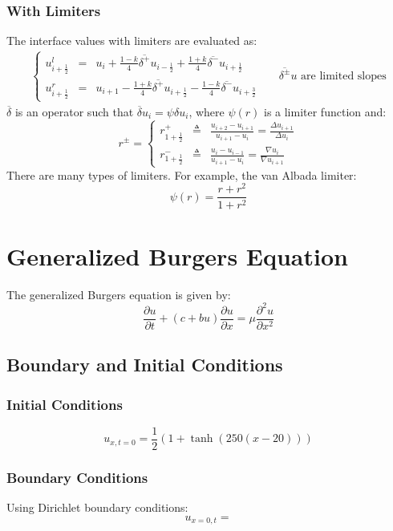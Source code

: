 \documentclass[11pt, a4paper]{article}
\begin{document}
\subsubsection{With Limiters}
The interface values with limiters are evaluated as:
\begin{equation}
    \begin{matrix}
        \left\{\begin{array}{lcl}
            u_{i+\frac{1}{2}}^l & = & u_i+\frac{1-k}{4}\overline{\delta^+} u_{i-\frac{1}{2}}+\frac{1+k}{4}\overline{\delta^-} u_{i+\frac{1}{2}} \\
            u_{i+\frac{1}{2}}^r & = & u_{i+1}-\frac{1+k}{4}\overline{\delta^+} u_{i+\frac{1}{2}}-\frac{1-k}{4}\overline{\delta^-} u_{i+\frac{3}{2}}
        \end{array}\right. && {\overline{\delta^\pm}} u\text{ are limited slopes}
    \end{matrix}
\end{equation}
$\overline{\delta}$ is an operator such that $\overline{\delta}u_i=\psi\delta u_i$, where $\psi\left(r\right)$ is a limiter function and:
\begin{equation}
    r^\pm=\left\{\begin{array}{ccc}
        r_{1+\frac{1}{2}}^+ & \triangleq & \displaystyle\frac{u_{i+2}-u_{i+1}}{u_{i+1}-u_i}=\frac{\Delta u_{i+1}}{\Delta u_i} \\
        r_{1+\frac{1}{2}}^- & \triangleq & \displaystyle\frac{u_{i}-u_{i-1}}{u_{i+1}-u_i}=\frac{\nabla u_{i}}{\nabla u_{i+1}}
    \end{array}\right.
\end{equation}
There are many types of limiters. For example, the van Albada limiter:
\begin{equation}
    \psi\left(r\right)=\frac{r+r^2}{1+r^2}
\end{equation}

\newpage
\section{Generalized Burgers Equation}
The generalized Burgers equation is given by:
\begin{equation}
    \frac{\partial u}{\partial t}+\left(c+bu\right)\frac{\partial u}{\partial x}=\mu\frac{\partial^2u}{\partial x^2}
\end{equation}
\subsection{Boundary and Initial Conditions}
\subsubsection{Initial Conditions}
\begin{equation}
    u_{x,t=0}=\frac{1}{2}\left(1+\tanh\left(250\left(x-20\right)\right)\right)
\end{equation}
\subsubsection{Boundary Conditions}
Using Dirichlet boundary conditions:
\begin{equation}
    u_{x=0,t}=
\end{equation}
\end{document}
